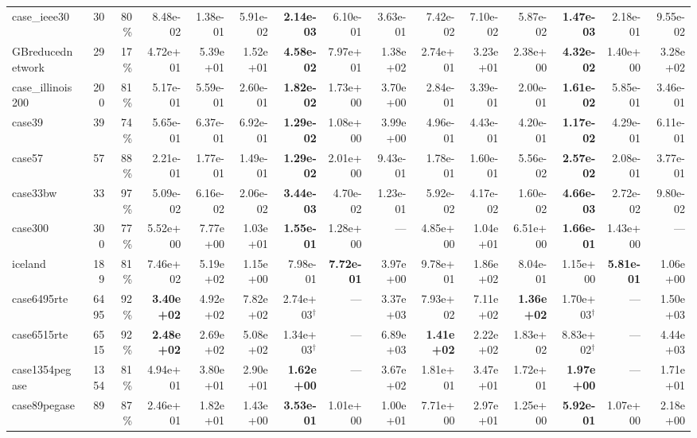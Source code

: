 \documentclass[10pt]{article}
\begin{document}
\begin{landscape}
\begin{table}[H]
\begin{tabular}{lrr rrrrrr rrrrrr}
case\_ieee30 & 30 & 80\% & 8.48e-02 & 1.38e-01 & 5.91e-02 & \textbf{2.14e-03} & 6.10e-01 & 3.63e-01 & 7.42e-02 & 7.10e-02 & 5.87e-02 & \textbf{1.47e-03} & 2.18e-01 & 9.55e-02 \\
GBreducednetwork & 29 & 17\% & 4.72e+01 & 5.39e+01 & 1.52e+01 & \textbf{4.58e-02} & 7.97e+01 & 1.38e+02 & 2.74e+01 & 3.23e+01 & 2.38e+00 & \textbf{4.32e-02} & 1.40e+00 & 3.28e+02 \\
case\_illinois200 & 200 & 81\% & 5.17e-01 & 5.59e-01 & 2.60e-01 & \textbf{1.82e-02} & 1.73e+00 & 3.70e+00 & 2.84e-01 & 3.39e-01 & 2.00e-01 & \textbf{1.61e-02} & 5.85e-01 & 3.46e-01 \\
case39 & 39 & 74\% & 5.65e-01 & 6.37e-01 & 6.92e-01 & \textbf{1.29e-02} & 1.08e+00 & 3.99e+00 & 4.96e-01 & 4.43e-01 & 4.20e-01 & \textbf{1.17e-02} & 4.29e-01 & 6.11e-01 \\
case57 & 57 & 88\% & 2.21e-01 & 1.77e-01 & 1.49e-01 & \textbf{1.29e-02} & 2.01e+00 & 9.43e-01 & 1.78e-01 & 1.60e-01 & 5.56e-02 & \textbf{2.57e-02} & 2.08e-01 & 3.77e-01 \\
case33bw & 33 & 97\% & 5.09e-02 & 6.16e-02 & 2.06e-02 & \textbf{3.44e-03} & 4.70e-02 & 1.23e-01 & 5.92e-02 & 4.17e-02 & 1.60e-02 & \textbf{4.66e-03} & 2.72e-02 & 9.80e-02 \\
case300 & 300 & 77\% & 5.52e+00 & 7.77e+00 & 1.03e+01 & \textbf{1.55e-01} & 1.28e+00 & --- & 4.85e+00 & 1.04e+01 & 6.51e+00 & \textbf{1.66e-01} & 1.43e+00 & --- \\
iceland & 189 & 81\% & 7.46e+02 & 5.19e+02 & 1.15e+00 & 7.98e-01 & \textbf{7.72e-01} & 3.97e+00 & 9.78e+01 & 1.86e+02 & 8.04e-01 & 1.15e+00 & \textbf{5.81e-01} & 1.06e+00 \\
case6495rte & 6495 & 92\% & \textbf{3.40e+02} & 4.92e+02 & 7.82e+02 & 2.74e+03$^\dagger$ & --- & 3.37e+03 & 7.93e+02 & 7.11e+02 & \textbf{1.36e+02} & 1.70e+03$^\dagger$ & --- & 1.50e+03 \\
case6515rte & 6515 & 92\% & \textbf{2.48e+02} & 2.69e+02 & 5.08e+02 & 1.34e+03$^\dagger$ & --- & 6.89e+03 & \textbf{1.41e+02} & 2.22e+02 & 1.83e+02 & 8.83e+02$^\dagger$ & --- & 4.44e+03 \\
case1354pegase & 1354 & 81\% & 4.94e+01 & 3.80e+01 & 2.90e+01 & \textbf{1.62e+00} & --- & 3.67e+02 & 1.81e+01 & 3.47e+01 & 1.72e+01 & \textbf{1.97e+00} & --- & 1.71e+01 \\
case89pegase & 89 & 87\% & 2.46e+01 & 1.82e+01 & 1.43e+00 & \textbf{3.53e-01} & 1.01e+00 & 1.00e+01 & 7.71e+00 & 2.97e+01 & 1.25e+00 & \textbf{5.92e-01} & 1.07e+00 & 2.18e+00 \\

\end{tabular}
\end{table}
\end{landscape}
\end{document}
